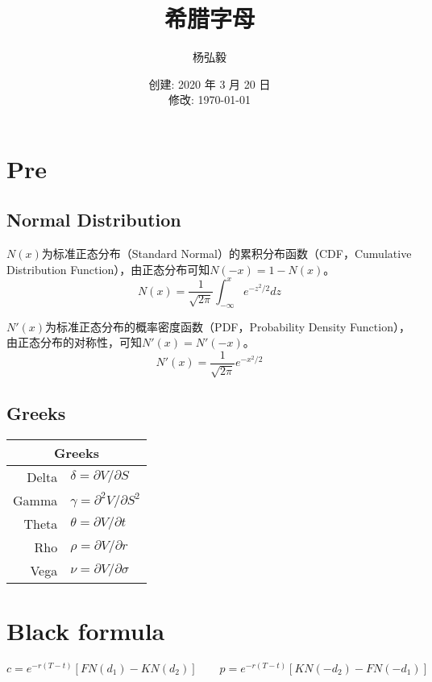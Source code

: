 \documentclass[11pt]{article}
\title{希腊字母}
\author{杨弘毅}
\date{创建: 2020 年 3 月 20 日 \\修改: \today}
\begin{document}
\maketitle

\section{Pre}
\subsection{Normal Distribution}
$N(x)$为标准正态分布（Standard Normal）的累积分布函数（CDF，Cumulative Distribution Function），由正态分布可知$N(-x) = 1-N(x)$。
\begin{equation*}
    N(x) = \frac{1}{\sqrt{2\pi}} \int_{-\infty}^{x}e^{-z^2/2}dz
\end{equation*}

$N'(x)$为标准正态分布的概率密度函数（PDF，Probability Density Function），由正态分布的对称性，可知$N'(x) = N'(-x)$。
\begin{equation*}
    N'(x) = \frac{1}{\sqrt{2\pi}} e^{-x^2/2}
\end{equation*}

\subsection{Greeks}
\begin{table}[H]
\centering
\begin{tabular}{@{}rl@{}}
\toprule
\multicolumn{2}{c}{Greeks} \\ 
\midrule
Delta  & $\delta = \partial V /\partial S$  \\
Gamma  & $\gamma = \partial^2 V /\partial S^2$  \\
Theta  & $\theta = \partial V /\partial t$   \\
Rho    & $\rho = \partial V/\partial r$  \\
Vega   & $\nu = \partial V/\partial\sigma$   \\ 
\bottomrule
\end{tabular}
\end{table}


\section{Black formula}
\begin{equation*}
    c = e^{-r(T-t)}[FN(d_1) - KN(d_2)] \qquad
    p = e^{-r(T-t)}[KN(-d_2) - FN(-d_1)]
\end{equation*}
\end{document}
